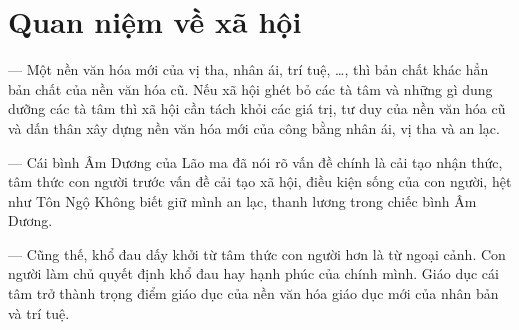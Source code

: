 \section{Quan niệm về xã hội} %
\label{sec:74_75_xa_hoi}

— Một nền văn hóa mới của vị tha, nhân ái, trí tuệ, \ldots, thì bản chất khác hẳn bản chất của nền văn hóa cũ. Nếu xã hội ghét bỏ các tà tâm và những gì dung dưỡng các tà tâm thì xã hội cần tách khỏi các giá trị, tư duy của nền văn hóa cũ và dấn thân xây dựng nền văn hóa mới của công bằng nhân ái, vị tha và an lạc.

— Cái bình Âm Dương của Lão ma đã nói rõ vấn đề chính là cải tạo nhận thức, tâm thức con người trước vấn đề cải tạo xã hội, điều kiện sống của con người, hệt như Tôn Ngộ Không biết giữ mình an lạc, thanh lương trong chiếc bình Âm Dương.

— Cũng thế, khổ đau dấy khởi từ tâm thức con người hơn là từ ngoại cảnh. Con người làm chủ quyết định khổ đau hay hạnh phúc của chính mình. Giáo dục cái tâm trở thành trọng điểm giáo dục của nền văn hóa giáo dục mới của nhân bản và trí tuệ.
